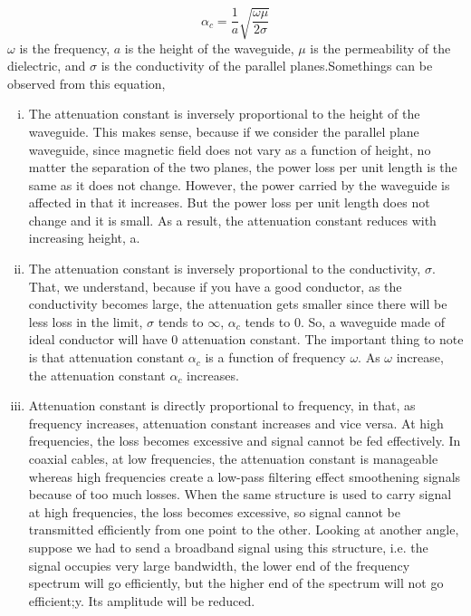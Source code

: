 \begin{equation}
\alpha_c=\frac{1}{a}\sqrt{\frac{\omega\mu}{2\sigma}}
\end{equation}
$\omega$ is the frequency, $a$ is the height of the waveguide, $\mu$ is the permeability of the dielectric, and $\sigma$ is the conductivity of the parallel planes.Somethings can be observed from this equation, 
\begin{enumerate}[(i)]
\item The attenuation constant is inversely proportional to the height of the waveguide. This makes sense, because if we consider the parallel plane waveguide, since magnetic field does not vary as a function of height, no matter the separation of the two planes, the power loss per unit length is the same as it does not change. However, the power carried by the waveguide is affected in that it increases. But the power loss per unit length does not change and it is small. As a result, the attenuation constant reduces with increasing height, a.
\item The attenuation constant is inversely proportional to the conductivity, $\sigma$. That, we understand, because if you have a good conductor, as the conductivity becomes large, the attenuation gets smaller since there will be less loss in the limit, $\sigma$ tends to $\infty$, $\alpha_{c}$ tends to 0. So, a waveguide made of ideal conductor will have 0 attenuation constant. The important thing to note is that attenuation constant $\alpha_{c}$ is a function of frequency $\omega$. As $\omega$ increase, the attenuation constant $\alpha_{c}$ increases.
\item Attenuation constant is directly proportional to frequency, in that, as frequency increases, attenuation constant increases and vice versa. At high frequencies, the loss becomes excessive and signal cannot be fed effectively. In coaxial cables, at low frequencies, the attenuation constant is manageable whereas high frequencies create a low-pass filtering effect smoothening signals because of too much losses. When the same structure is used to carry signal at high frequencies, the loss becomes excessive, so signal cannot be transmitted efficiently from one point to the other. Looking at another angle, suppose we had to send a broadband signal using this structure, i.e. the signal occupies very large bandwidth, the lower end of the frequency spectrum will go efficiently, but the higher end of the spectrum will not go efficient;y. Its amplitude will be reduced.
\end{enumerate}
